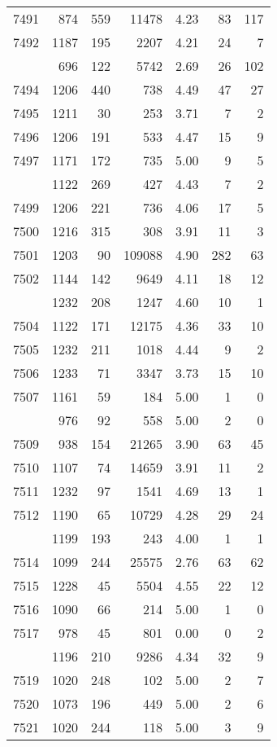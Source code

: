 \documentclass[
]{article}
\begin{document}
\begin{table}
\begin{tabular}[t]{lrrrrrr}
7491 & 874 & 559 & 11478 & 4.23 & 83 & 117\\
7492 & 1187 & 195 & 2207 & 4.21 & 24 & 7\\
\addlinespace
7493 & 696 & 122 & 5742 & 2.69 & 26 & 102\\
7494 & 1206 & 440 & 738 & 4.49 & 47 & 27\\
7495 & 1211 & 30 & 253 & 3.71 & 7 & 2\\
7496 & 1206 & 191 & 533 & 4.47 & 15 & 9\\
7497 & 1171 & 172 & 735 & 5.00 & 9 & 5\\
\addlinespace
7498 & 1122 & 269 & 427 & 4.43 & 7 & 2\\
7499 & 1206 & 221 & 736 & 4.06 & 17 & 5\\
7500 & 1216 & 315 & 308 & 3.91 & 11 & 3\\
7501 & 1203 & 90 & 109088 & 4.90 & 282 & 63\\
7502 & 1144 & 142 & 9649 & 4.11 & 18 & 12\\
\addlinespace
7503 & 1232 & 208 & 1247 & 4.60 & 10 & 1\\
7504 & 1122 & 171 & 12175 & 4.36 & 33 & 10\\
7505 & 1232 & 211 & 1018 & 4.44 & 9 & 2\\
7506 & 1233 & 71 & 3347 & 3.73 & 15 & 10\\
7507 & 1161 & 59 & 184 & 5.00 & 1 & 0\\
\addlinespace
7508 & 976 & 92 & 558 & 5.00 & 2 & 0\\
7509 & 938 & 154 & 21265 & 3.90 & 63 & 45\\
7510 & 1107 & 74 & 14659 & 3.91 & 11 & 2\\
7511 & 1232 & 97 & 1541 & 4.69 & 13 & 1\\
7512 & 1190 & 65 & 10729 & 4.28 & 29 & 24\\
\addlinespace
7513 & 1199 & 193 & 243 & 4.00 & 1 & 1\\
7514 & 1099 & 244 & 25575 & 2.76 & 63 & 62\\
7515 & 1228 & 45 & 5504 & 4.55 & 22 & 12\\
7516 & 1090 & 66 & 214 & 5.00 & 1 & 0\\
7517 & 978 & 45 & 801 & 0.00 & 0 & 2\\
\addlinespace
7518 & 1196 & 210 & 9286 & 4.34 & 32 & 9\\
7519 & 1020 & 248 & 102 & 5.00 & 2 & 7\\
7520 & 1073 & 196 & 449 & 5.00 & 2 & 6\\
7521 & 1020 & 244 & 118 & 5.00 & 3 & 9\\

\end{tabular}
\end{table}
\end{document}
